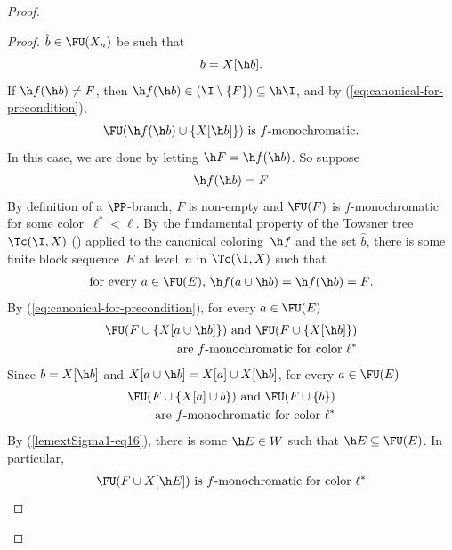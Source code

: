 \documentclass{article}
\numberwithin{theorem}{section}
\begin{document}
\begin{proof}
\begin{proof}
$\hat b\in \FU(X_n)$
be such that
$$b = X[\h b].$$
If $\h f(\h b) \neq F$, then $\h f(\h b) \in (\I \setminus \{F\}) \subseteq \h \I$, and by (\ref{eq:canonical-for-precondition}),
\begin{align}\label{lemextSigma1-eq20}
\FU(\h f(\h b) \cup \{X[\h b]\})\text{ is $f$-monochromatic.}
\end{align}
In this case, we are done by letting $\h F = \h f(\h b)$. So suppose
\begin{align}\label{newlemextSigma1-good-color}
\h f(\h b) = F
\end{align}
By definition of a $\PP$-branch, $F$ is non-empty and $\FU(F)$ is $f$-monochromatic for some color~$\ell^* < \ell$.
By the fundamental property of the Towsner tree $\Tc(\I, X)$ () applied to the canonical coloring~$\h f$ and the set $\hat b$, there is some finite block sequence~$E$ at level~$n$ in $\Tc(\I, X)$ such that
\begin{align}\label{newlemextSigma1-eq2}
\text{for every $a \in \FU(E)$, $\h f(a \cup \h b) = \h f(\h b) = F$.} 
\end{align}
By (\ref{eq:canonical-for-precondition}), for every $a \in \FU(E)$
\begin{align}\label{newlemextSigma1-eq3}
\text{$\FU(F \cup \{X[a \cup \h b]\})$ and $\FU(F \cup \{X[\h b]\})$} \notag\\
\text{are $f$-monochromatic for color~$\ell^*$}
\end{align}
Since $b = X[\h b]$ and $X[a \cup \h b] = X[a] \cup X[\h b]$, for every $a \in \FU(E)$
\begin{align}\label{newlemextSigma1-eq5}
\text{$\FU(F \cup \{X[a] \cup b\})$ and $\FU(F \cup \{b\})$} \notag\\
\text{are $f$-monochromatic for color~$\ell^*$}
\end{align}
By (\ref{lemextSigma1-eq16}), there is some $\h E \in W$ such that $\h E \subseteq \FU(E)$. In particular, 
\begin{align}\label{newlemextSigma1-eq4}
\text{$\FU(F \cup X[\h E])$ is $f$-monochromatic for color~$\ell^*$}
\end{align}

\end{proof}
\end{proof}
\end{document}
